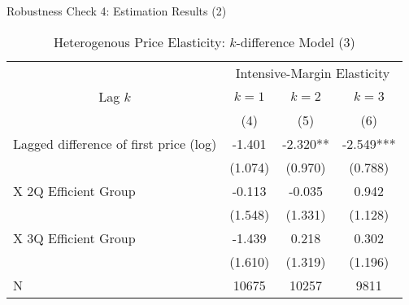 \documentclass[
  ignorenonframetext,
]{beamer}
\begin{document}
\begin{frame}{Robustness Check 4: Estimation Results (2)}
\protect\hypertarget{robustness-check-4-estimation-results-2}{}
\begin{table}

\caption{\label{tab:kableHeterokDiffElasticitySlide3}Heterogenous Price Elasticity: $k$-difference Model (3)}
\centering
\fontsize{8}{10}\selectfont
\begin{tabular}[t]{lccc}
\toprule
\multicolumn{1}{c}{ } & \multicolumn{3}{c}{Intensive-Margin Elasticity} \\
\cmidrule(l{3pt}r{3pt}){2-4}
\multicolumn{1}{c}{Lag $k$} & \multicolumn{1}{c}{$k = 1$} & \multicolumn{1}{c}{$k = 2$} & \multicolumn{1}{c}{$k = 3$} \\
\cmidrule(l{3pt}r{3pt}){1-1} \cmidrule(l{3pt}r{3pt}){2-2} \cmidrule(l{3pt}r{3pt}){3-3} \cmidrule(l{3pt}r{3pt}){4-4}
 & (4) & (5) & (6)\\
\midrule
Lagged difference of first price (log) & -1.401 & -2.320** & -2.549***\\
 & (1.074) & (0.970) & (0.788)\\
\hspace{1em}X 2Q Efficient Group & -0.113 & -0.035 & 0.942\\
 & (1.548) & (1.331) & (1.128)\\
\hspace{1em}X 3Q Efficient Group & -1.439 & 0.218 & 0.302\\
 & (1.610) & (1.319) & (1.196)\\
N & 10675 & 10257 & 9811\\
\bottomrule
\end{tabular}
\end{table}
\end{frame}
\end{document}
